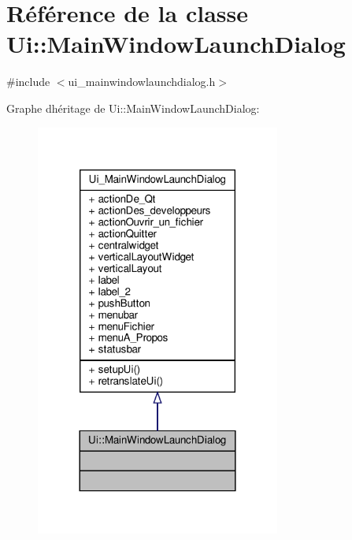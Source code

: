 \hypertarget{classUi_1_1MainWindowLaunchDialog}{}\section{Référence de la classe Ui\+:\+:Main\+Window\+Launch\+Dialog}
\label{classUi_1_1MainWindowLaunchDialog}


{\ttfamily \#include $<$ui\+\_\+mainwindowlaunchdialog.\+h$>$}



Graphe d\textquotesingle{}héritage de Ui\+:\+:Main\+Window\+Launch\+Dialog\+:\nopagebreak
\begin{figure}[H]
\begin{center}
\leavevmode
\includegraphics[width=228pt]{classUi_1_1MainWindowLaunchDialog__inherit__graph}
\end{center}
\end{figure}


